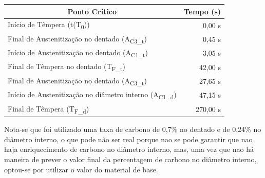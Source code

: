 \begin{table}[htb]
    \centering
    \label{tab:pontos_sim}
    \begin{tabular}{lr} 
    \toprule
    \multicolumn{1}{c}{\textbf{Ponto Crítico}}            & \multicolumn{1}{c}{\textbf{Tempo (s)}}                         \\ 
    \hline\hline
    Início de Têmpera (t(T\textsubscript{0}))                             & 0,00 s                                         \\ 
    \hline
    Final de Austenitização no dentado (A\textsubscript{C3\_t})           & 0,45 s                                         \\
    Início de Austenitização no dentado (A\textsubscript{C1\_t})          & 3,05 s                                         \\
    Final de Têmpera no dentado (T\textsubscript{F\_t})                   & 42,00 s                                        \\ 
    \hline\hline
    Final de Austenitização no dentado (A\textsubscript{C3\_t})           & 27,65 s                                        \\
    Início de Austenitização no diâmetro interno (A\textsubscript{C1\_d}) & 47,15 s                                        \\ 
    Final de Têmpera (T\textsubscript{F\_d})                              & 270,00 s                                       \\
    \bottomrule
    \end{tabular}
\end{table}
\par Nota-se que foi utilizado uma taxa de carbono de 0,7\% no dentado e de 0,24\% no diâmetro interno, o que pode não ser real porque nao se pode garantir que nao haja enriquecimento de carbono no diâmetro interno, mas, uma vez que nao há maneira de prever o valor final da percentagem de carbono no diâmetro interno, optou-se por utilizar o valor do material de base.